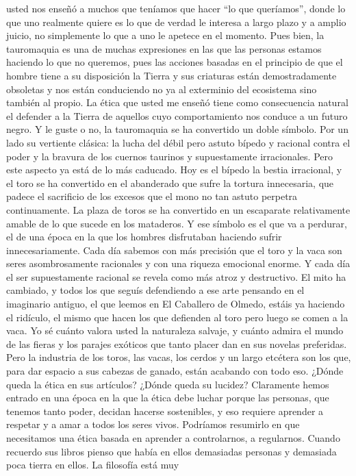 \documentclass[a4paper,11pt,openright,twocolumn]{book}
\begin{document}
usted nos enseñó a muchos que teníamos que hacer ``lo que queríamos'', donde lo que uno realmente quiere es lo que
de verdad le interesa a largo plazo y a amplio juicio, no simplemente lo que a uno le apetece en el momento. Pues bien,
la tauromaquia es una de muchas expresiones en las que las personas estamos haciendo lo que no queremos, pues las
acciones basadas en el principio de que el hombre tiene a su disposición la Tierra y sus criaturas están demostradamente
obsoletas y nos están conduciendo no ya al exterminio del ecosistema sino también al propio. La ética que usted me enseñó tiene
como consecuencia natural el defender a la Tierra de aquellos cuyo comportamiento nos conduce a un futuro negro. Y le guste 
o no, la tauromaquia se ha convertido un doble símbolo. Por un lado su vertiente clásica: la lucha del débil pero astuto
bípedo y racional contra el poder y la bravura de los cuernos taurinos y supuestamente irracionales. Pero este aspecto
ya está de lo más caducado. Hoy es el bípedo la bestia irracional, y el toro se ha convertido en el abanderado que sufre
la tortura innecesaria, que padece el sacrificio de los excesos que el mono no tan astuto perpetra continuamente. La plaza
de toros se ha convertido en un escaparate relativamente amable de lo que sucede en los mataderos. Y ese símbolo es el que va a perdurar,
el de una época en la que los hombres disfrutaban haciendo sufrir innecesariamente. Cada día sabemos con más precisión que
el toro y la vaca son seres asombrosamente racionales y con una riqueza emocional enorme. Y cada día el ser supuestamente racional se
revela como más atroz y destructivo. El mito ha cambiado, y todos los que seguís defendiendo a ese arte pensando en el 
imaginario antiguo, el que leemos en El Caballero de Olmedo, estáis ya haciendo el ridículo, el mismo que hacen los que defienden
al toro pero luego se comen a la vaca. Yo sé cuánto valora usted
la naturaleza salvaje, y cuánto admira el mundo de las fieras y los parajes exóticos que tanto placer dan en sus 
novelas preferidas. Pero la industria de los toros, las vacas, los cerdos y un largo etcétera son los que, para dar
espacio a sus cabezas de ganado, están acabando con todo eso. ¿Dónde queda la ética en sus artículos? ¿Dónde queda
su lucidez? Claramente hemos entrado en una época en la que la ética debe luchar porque las personas, que tenemos
tanto poder, decidan hacerse sostenibles, y eso requiere aprender a respetar y a amar a todos los seres vivos. Podríamos resumirlo en
que necesitamos una ética basada en aprender a controlarnos, a regularnos. Cuando
recuerdo sus libros pienso que había en ellos demasiadas personas y demasiada poca tierra en ellos. La filosofía está muy
\end{document}
